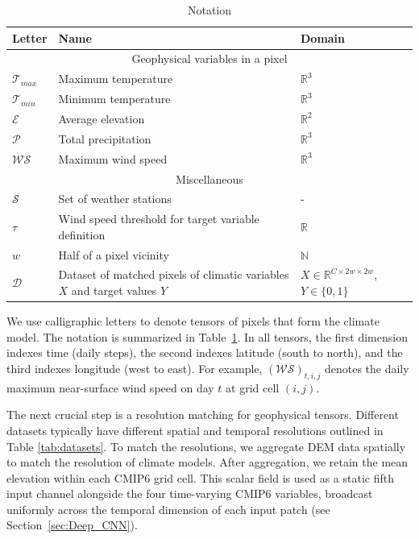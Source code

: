 \documentclass{article}
\begin{document}
\begin{table}[!b]
    \centering
    \begin{tabular}{p{0.7cm}|p{4.1cm}|p{2.5cm}}%
        \toprule
        Letter & Name & Domain  \\
        \midrule
        \multicolumn{3}{c}{Geophysical variables in a pixel} 
        \\
        \midrule
        $\mathcal{T}_{max}$ & Maximum temperature & $\mathbb{R}^3$   \\
        \midrule
        $\mathcal{T}_{min}$ & Minimum temperature & $\mathbb{R}^3$   \\
        \midrule
        $\mathcal{E}$ & Average elevation & $\mathbb{R}^2$   \\
        \midrule
        $\mathcal{P}$ & Total precipitation & $\mathbb{R}^3$   \\
        \midrule
        $\mathcal{WS}$ & Maximum wind speed & $\mathbb{R}^3$   \\
        \midrule
        \multicolumn{3}{c}{Miscellaneous}
        \\
        \midrule
        $\mathcal{S}$ & Set of weather stations & -
        \\
        \midrule
        $\tau$ & Wind speed threshold for target variable definition & $\mathbb{R}$ \\
        \midrule
        $w$ & Half of a pixel vicinity & $\mathbb{N}$
        \\
        \midrule
        $\mathcal{D}$ & Dataset of matched pixels of climatic variables $X$ and target values $Y$ &  
        $X\in\mathbb{R}^{C \times 2w \times 2w}$,
        $Y \in \{0, 1\}$
        \\
        \bottomrule
    \end{tabular}
    \caption{Notation}
    \label{tab:table_of_notations}
\end{table}

We use calligraphic letters to denote tensors of pixels that form the climate model. The notation is summarized in Table~\ref{tab:table_of_notations}. In all tensors, the first dimension indexes time (daily steps), the second indexes latitude (south to north), and the third indexes longitude (west to east). For example, $(\mathcal{WS})_{t,i,j}$ denotes the daily maximum near-surface wind speed on day $t$ at grid cell $(i,j)$.

The next crucial step is a resolution matching for geophysical tensors. Different datasets typically have different spatial and temporal resolutions outlined in Table \ref{tab:datasets}. To match the resolutions, we aggregate DEM data spatially to match the resolution of climate models. After aggregation, we retain the mean elevation within each CMIP6 grid cell. This scalar field is used as a static fifth input channel alongside the four time-varying CMIP6 variables, broadcast uniformly across the temporal dimension of each input patch (see Section~\ref{sec:Deep_CNN}).
\end{document}

